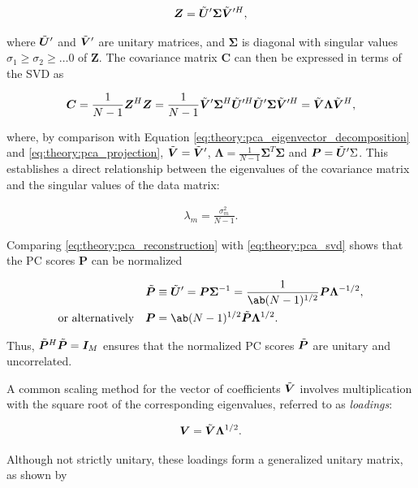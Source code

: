 \begin{align}\label{eq:theory:pca_svd}
    \bm{Z} = \tilde{\bm{U}}' \bm{\Sigma} \tilde{\bm{V}}'^H,
\end{align}

where $\tilde{\bm{U}}'$ and $\tilde{\bm{V}}'$ are unitary matrices, and $\bm{\Sigma}$ is diagonal with singular values $\sigma_1\geq\sigma_2\geq\dots 0$ of $\bm{Z}$. The covariance matrix $\bm{C}$ can then be expressed in terms of the SVD as

\begin{align}
    \bm{C} = \frac{1}{N-1} \bm{Z}^H \bm{Z} = \frac{1}{N-1} \tilde{\bm{V}}' \bm{\Sigma}^H \tilde{\bm{U}}'^H \tilde{\bm{U}}' \bm{\Sigma} \tilde{\bm{V}}'^H = \tilde{\bm{V}} \bm{\Lambda} {\tilde{\bm{V}}}^H,
\end{align}

where, by comparison with Equation \eqref{eq:theory:pca_eigenvector_decomposition} and \eqref{eq:theory:pca_projection}, $\tilde{\bm{V}} = \tilde{\bm{V}}'$, $\bm{\Lambda} = \frac{1}{N-1} \bm{\Sigma}^T \bm{\Sigma}$ and $\bm{P} = \tilde{\bm{U}}' \Sigma$. This establishes a direct relationship between the eigenvalues of the covariance matrix and the singular values of the data matrix:

\begin{align}
    \lambda_m = \frac{ \sigma_m^2}{N-1}.
\end{align}

Comparing \eqref{eq:theory:pca_reconstruction} with \eqref{eq:theory:pca_svd} shows that the PC scores $\bm{P}$ can be normalized

\begin{align}
    \bmn{P} &\equiv \bmn{U}'= \bm{P} \bm{\Sigma}^{-1} = \frac{1}{\ab(N-1)^{1/2}} \bm{P} \bm{\Lambda}^{-1/2}, \nonumber \\
    \text{or alternatively} \quad \bm{P} &= \ab(N-1)^{1/2} \bmn{P} \bm{\Lambda}^{1/2}.
\end{align}

Thus, $\tilde{\bm{P}}^H\tilde{\bm{P}} = \bm{I}_M$ ensures that the normalized PC scores $\tilde{\bm{P}}$ are unitary and uncorrelated.

A common scaling method for the vector of coefficients $\tilde{\bm{V}}$ involves multiplication with the square root of the corresponding eigenvalues, referred to as \textit{loadings}:

\begin{align}
    \bm{V} = \tilde{\bm{V}} \bm{\Lambda}^{1/2}.
\end{align}

Although not strictly unitary, these loadings form a generalized unitary matrix, as shown by


